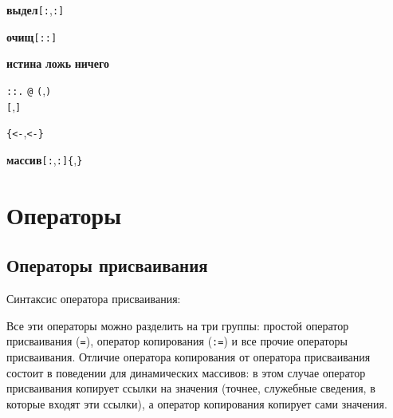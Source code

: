 \documentclass[10pt]{report}
\begin{document}
\is\textbf{выдел}\rbo\texttt{[:}\rbo,\rbc\kleene\texttt{:]}\rbc\optional{}

\is\textbf{очищ}\rbo\texttt{[:}\texttt{:]}\rbc\optional{}

\is{} \sor {}  \sor {} \sor {} \sor {} \sor \textbf{истина} \sor \textbf{ложь} \sor \textbf{ничего}

\is\rbo{}\texttt{::}\rbc\kleene{}\rbo\texttt{.} \sor \texttt{@} \sor  \texttt{(}\rbo{}\rbo,\rbc\kleene\rbc\optional\texttt{)} \sor\\
\phantom{имя88888}\texttt{[}\rbo{}\rbo,\rbc\kleene\rbc\optional\texttt{]}\rbc\kleene

\is{} \sor {}

\is{}\texttt{\{}\rbo{}\texttt{<-}\rbo,\texttt{<-}\rbc\kleene\rbc\optional\texttt{\}}

\is\textbf{массив}\texttt{[:}\optional\rbo,\optional\rbc\kleene\texttt{:]}\texttt{\{}\rbo,\rbc\kleene \texttt{\}}

   
\chapter{Операторы}
\section{Операторы присваивания}
Синтаксис оператора присваивания:
\begin{center}
	  
\end{center}

Все эти операторы можно разделить на три группы: простой оператор присваивания (\texttt{=}), оператор копирования (\texttt{:=}) и все прочие операторы присваивания.
Отличие оператора копирования от оператора присваивания состоит в поведении для динамических массивов: в этом случае оператор присваивания копирует
ссылки на значения (точнее, служебные сведения, в которые входят эти ссылки), а оператор копирования копирует сами значения. 
\end{document}
